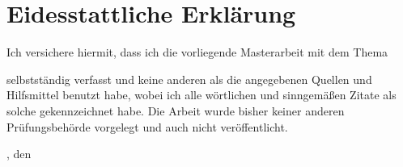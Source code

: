 \chapter*{Eidesstattliche Erklärung} %

Ich versichere hiermit, dass ich die vorliegende Masterarbeit mit dem Thema
\begin{quote}
    \textit{\titleDocument}
\end{quote}
selbstständig verfasst und keine anderen als die angegebenen Quellen und Hilfsmittel benutzt habe, wobei ich alle wörtlichen und sinngemäßen Zitate als solche gekennzeichnet habe.
Die Arbeit wurde bisher keiner anderen Prüfungsbehörde vorgelegt und auch nicht veröffentlicht.

\vspace*{2cm}

\begingroup
\setlength{\parindent}{0pt} %

\locationDocument, den \dateDocument
\bigskip
\bigskip

\newlength{\widthbox}
\settowidth{\widthbox}{\locationDocument, den \dateDocument}

\makebox[\widthbox]{\hrulefill}\\
\authorDocument
\endgroup